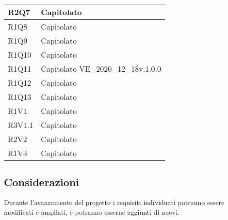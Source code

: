 \begin{center}
\begin{longtable}{|p{22mm}|p{44mm}|}
R2Q7 &
Capitolato 
\\
\hline

R1Q8 &
Capitolato 
\\
\hline

R1Q9 &
Capitolato 
\\
\hline

R1Q10 &
Capitolato 
\\
\hline

R1Q11 &
Capitolato \newline
VE\_2020\_12\_18v.1.0.0 
\\
\hline

R1Q12 &
Capitolato 
\\
\hline

R1Q13 &
Capitolato 
\\
\hline

 R1V1 &
Capitolato 
\\
\hline

R3V1.1 &
Capitolato 
\\
\hline

R2V2 &
Capitolato 
\\
\hline

R1V3 &
Capitolato 
\\
\hline%
	
	\end{longtable}
\end{center}

\subsection{Considerazioni}
Durante l'avanzamento del progetto i requisiti individuati potranno essere modificati e ampliati, e potranno esserne aggiunti di nuovi.